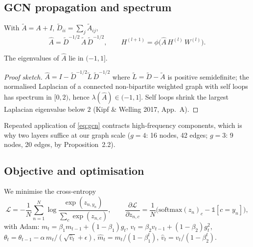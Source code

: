 \subsection{GCN propagation and spectrum}
\begin{definition}
With $\tilde A = A + I$, $\tilde D_{ii}=\sum_j \tilde A_{ij}$,
\begin{equation}
\hat A = \tilde D^{-1/2}\,\tilde A\,\tilde D^{-1/2},
\qquad H^{(l+1)} = \phi\!\big(\hat A\, H^{(l)}\, W^{(l)}\big).
\label{eq:gcn}
\end{equation}
\end{definition}
\begin{lemma}
The eigenvalues of $\hat A$ lie in $(-1, 1]$.
\end{lemma}
\begin{proof}[Proof sketch]
$\hat A = I - \tilde D^{-1/2} \tilde L\, \tilde D^{-1/2}$ where
$\tilde L = \tilde D - \tilde A$ is positive semidefinite; the normalised
Laplacian of a connected non-bipartite weighted graph with self loops has
spectrum in $[0, 2)$, hence $\lambda(\hat A) \in (-1, 1]$. Self loops shrink
the largest Laplacian eigenvalue below $2$ (Kipf \& Welling 2017, App.\ A).
\end{proof}
Repeated application of \eqref{eq:gcn} contracts high-frequency components,
which is why two layers suffice at our graph scale ($g{=}4$: 16 nodes, 42 edges; $g{=}3$: 9 nodes,
20 edges, by Proposition~2.2).

\subsection{Objective and optimisation}
We minimise the cross-entropy
\begin{equation}
\mathcal L = -\frac{1}{N}\sum_{n=1}^N \log \frac{\exp(z_{n,y_n})}{\sum_{c}\exp(z_{n,c})},
\qquad
\frac{\partial \mathcal L}{\partial z_{n,c}} = \frac{1}{N}\big(\mathrm{softmax}(z_n)_c - \mathbb 1[c = y_n]\big),
\label{eq:xent}
\end{equation}
with Adam: $m_t = \beta_1 m_{t-1} + (1-\beta_1) g_t$,
$v_t = \beta_2 v_{t-1} + (1-\beta_2) g_t^2$,
$\theta_t = \theta_{t-1} - \alpha\, \hat m_t/(\sqrt{\hat v_t}+\epsilon)$,
$\hat m_t = m_t/(1-\beta_1^t)$, $\hat v_t = v_t/(1-\beta_2^t)$.

